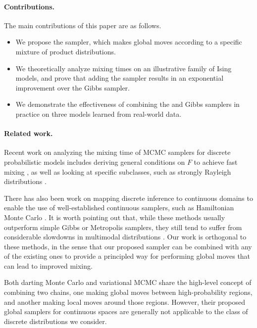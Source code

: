 \paragraph{Contributions.}
The main contributions of this paper are as follows.
\begin{itemize}
\item We propose the \Ms{} sampler, which makes global moves according to a specific mixture of product distributions.
\item We theoretically analyze mixing times on an illustrative family of Ising models, and prove that adding the \Ms{} sampler results in an exponential improvement over the Gibbs sampler.
\item We demonstrate the effectiveness of combining the \Ms{} and Gibbs samplers in practice on three models learned from real-world data.
\end{itemize}

\paragraph{Related work.}
Recent work on analyzing the mixing time of MCMC samplers for discrete probabilistic models includes deriving general conditions on $F$ to achieve fast mixing \citep{gotovos15, rebeschini15, li16}, as well as looking at specific subclasses, such as strongly Rayleigh distributions \citep{li16, anari16}.

There has also been work on mapping discrete inference to continuous domains \citep{zhang12, pakman13, dinh17, nishimura18} to enable the use of well-established continuous samplers, such as Hamiltonian Monte Carlo \citep{neal12, betancourt17}.
It is worth pointing out that, while these methods usually outperform simple Gibbs or Metropolis samplers, they still tend to suffer from considerable slowdowns in multimodal distributions \citep{neal12}.
Our work is orthogonal to these methods, in the sense that our proposed sampler can be combined with any of the existing ones to provide a principled way for performing global moves that can lead to improved mixing.

Both darting Monte Carlo \citep{sminchisescu07,ahn13} and variational MCMC \citep{defreitas01} share the high-level concept of combining two chains, one making global moves between high-probability regions, and another making local moves around those regions.
However, their proposed global samplers for continuous spaces are generally not applicable to the class of discrete distributions we consider.

